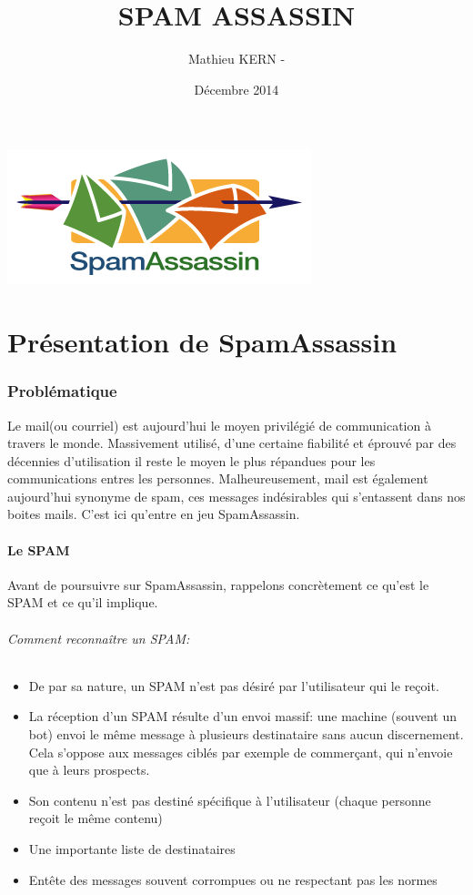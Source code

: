 \documentclass[a4paper,11pt]{article}
\title{SPAM ASSASSIN}
\date{Décembre 2014}
\author{Mathieu KERN -}
\begin{document}
\maketitle
\includegraphics{spamassassinintro.png}
\pagebreak

\tableofcontents

\pagebreak

\part{Présentation de SpamAssassin}

\section{Problématique }

  Le mail(ou courriel) est aujourd'hui le moyen privilégié de communication à travers le monde. Massivement utilisé, 
d'une certaine fiabilité et éprouvé par des décennies d'utilisation il reste le moyen le plus répandues pour 
les communications entres les personnes. Malheureusement, mail est également aujourd'hui synonyme de spam, ces messages
indésirables qui s'entassent dans nos boites mails. C'est ici qu'entre en jeu SpamAssassin.

\subsection{Le SPAM}
Avant de poursuivre sur SpamAssassin, rappelons concrètement ce qu'est le SPAM et ce qu'il implique. 

\paragraph{Comment reconnaître un SPAM:}

\begin{itemize}
 \item De par sa nature, un SPAM n'est pas désiré par l'utilisateur qui le reçoit. 
 \item La réception d'un SPAM résulte d'un envoi massif: une machine (souvent un bot) envoi le même message 
 à plusieurs destinataire sans aucun discernement. Cela s'oppose aux messages ciblés par exemple de commerçant,
 qui n’envoie que à leurs prospects.
 \item Son contenu n'est pas destiné spécifique à l'utilisateur (chaque personne reçoit le même contenu)
 \item Une importante liste de destinataires 
 \item Entête des messages souvent corrompues ou ne respectant pas les normes
\end{itemize}
\end{document}
